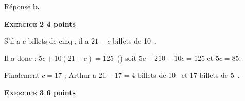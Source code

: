 \documentclass[10pt]{article}
\newcommand{\euro}{\eurologo{}}
\begin{document}
\begin{enumerate}
Réponse \textbf{b.}
\medskip 
\end{enumerate}

\bigskip

\textbf{\textsc{Exercice 2} \hfill 4 points}

\medskip 

% 
%
% 
S'il a $c$ billets de cinq \euro, il a $21 - c$ billets de 10~\euro.

Il a donc :
$5c + 10(21 - c) = 125$~(\euro) soit $5c + 210 - 10c = 125$ et $5c = 85$.

Finalement $c = 17$ ; Arthur a $21 - 17 = 4$ billets de 10~\euro{} et 17 billets de 5~\euro.

%

\bigskip

\textbf{\textsc{Exercice 3} \hfill 6 points}

\medskip

% 
% 
%
 
\end{document}
